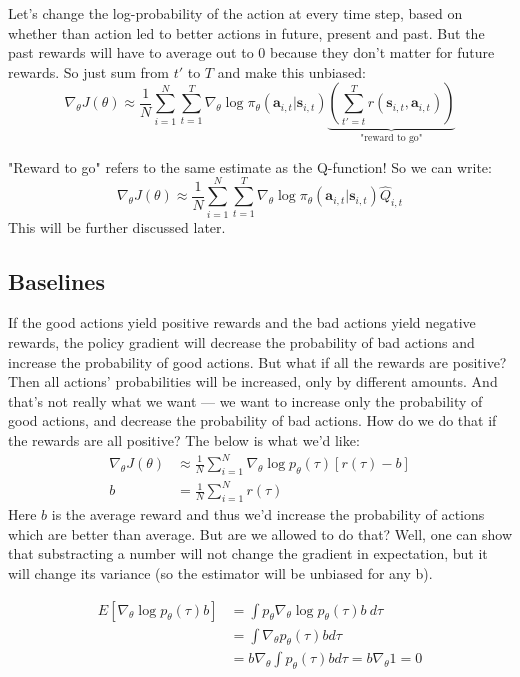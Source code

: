 \documentclass{report}
\begin{document}
Let's change the log-probability of the action at every time step,
based on whether than action led to better actions in future, present and past.
But the past rewards will have to average out to 0 because they don't matter for future rewards.
So just sum from $t'$ to $T$ and make this unbiased:
\begin{equation}
		\label{eq:reward_to_go}
		\nabla_\theta J(\theta) \approx 
		\frac{1}{N} \sum_{i=1}^{N} \sum_{t=1}^{T} \nabla_\theta \log \pi_\theta (\bm{a}_{i,t}| \bm{s}_{i,t})
		\underbrace{\left ( \sum_{t'=t}^{T} r (\bm{s}_{i,t}, \bm{a}_{i,t}) \right )}_{\text{"reward to go"}}
\end{equation}

"Reward to go" refers to the same estimate as the Q-function!
So we can write:
\begin{equation}
		\nabla_\theta J(\theta) \approx 
		\frac{1}{N} \sum_{i=1}^{N} \sum_{t=1}^{T} \nabla_\theta \log \pi_\theta (\bm{a}_{i,t}| \bm{s}_{i,t})
		\hat{Q}_{i,t} 
\end{equation}
This will be further discussed later.

\subsection{Baselines}
If the good actions yield positive rewards and the bad actions yield negative rewards,
the policy gradient will decrease the probability of bad actions and increase the probability 
of good actions.
But what if all the rewards are positive?
Then all actions' probabilities will be increased, only by different amounts.
And that's not really what we want --- we want to increase only the probability of good actions,
and decrease the probability of bad actions.
How do we do that if the rewards are all positive?
The below is what we'd like:
\begin{align}
		\nabla_\theta J(\theta) &\approx 
		\frac{1}{N} \sum_{i=1}^{N}
		\nabla_\theta \log p_\theta (\tau) [ r(\tau) - b] \\
		b &= \frac{1}{N} \sum_{i=1}^{N} r(\tau)
\end{align}
Here $b$ is the average reward and thus we'd increase the probability of
actions which are better than average.
But are we allowed to do that?
Well, one can show that substracting a number will not change the gradient in expectation,
but it will change its variance (so the estimator will be unbiased for any b).

\begin{align}
E \left [ \nabla_\theta \log p_\theta (\tau) b \right ] &=
\int{p_\theta \nabla_\theta \log p_\theta (\tau) b}  \: d{\tau}  \\
 & =
\int{ \nabla_\theta p_\theta (\tau) b } d{\tau}  \\
 &= 
b \nabla_\theta \int { p_\theta (\tau) b } d{\tau} = b \nabla_\theta 1 = 0
\end{align}
\end{document}
